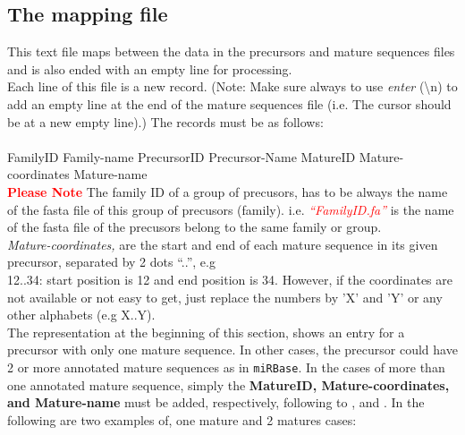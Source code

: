 \documentclass[a4paper,20pt]{report}
\newcommand*\circled[1]{\tikz[baseline=(char.base)]{
            \node[shape=circle,draw,inner sep=2pt] (char) {#1};}}
\newcommand{\note}{\textcolor{red}}
\newcommand*{\rom}[1]{\uppercase\expandafter{\romannumeral #1\relax}}
\begin{document}
\subsection{The mapping file}
\label{sec:map}
\noindent
This text file maps between the data in the precursors and mature sequences files and is also ended with an empty line for processing.\\
Each line of this file is a new record. (Note: Make sure always to use \textit{enter} (\textbackslash n) to add an empty line at the end of the mature sequences file (i.e. The cursor should be at a new empty line).) The records must be as follows:\\
\rom{1} \hspace{1.2cm}\rom{2} \hspace{1.2cm}\rom{3} \hspace{1.2cm}\rom{4} \hspace{1.5cm}\rom{5} \hspace{1.2cm}\rom{6} \hspace{1.6cm} \rom{7}\\
\scriptsize FamilyID Family-name PrecursorID Precursor-Name MatureID Mature-coordinates Mature-name\\
\noindent
\normalsize \textbf{\note{Please Note}} The family ID of a group of precusors, has to be always the name of the fasta file of this group of precusors (family). 
i.e. \textit{\note{``FamilyID.fa''}} is the name of the fasta file of the precusors belong to the same family or 
group.\\

\noindent
\normalsize \textit{Mature-coordinates,} are the start and end of each mature sequence in its given precursor, separated by 2 dots ``..'', e.g\\
12..34: start position is 12 and end position is 34. However, if the coordinates are not available or not easy to get, just replace the numbers 
by 'X' and 'Y' or any other alphabets (e.g X..Y).\\
The representation at the beginning of this section, shows an entry for a precursor with only one mature sequence. 
In other cases, the precursor could have 2 or more annotated mature sequences as in \texttt{miRBase}. In the cases 
of more than one annotated mature sequence, simply the \small \textbf{MatureID, Mature-coordinates, and Mature-name} 
\normalsize must be added, respectively, following to \rom{5},
\rom{6} and \rom{7}. In the following are two examples of, one mature and 2 matures cases:\\
\end{document}
